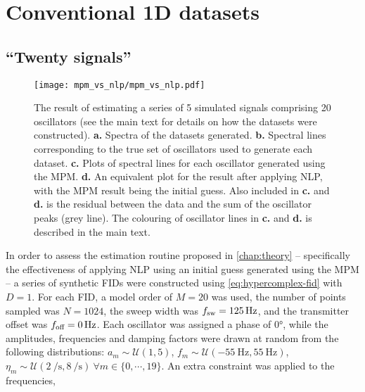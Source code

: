 \section{Conventional \ac{1D} datasets}
\label{sec:evaluation}

\subsection{``Twenty signals''}
\begin{sidewaysfigure}
    \centering
    \texttt{[image: mpm\_vs\_nlp/mpm\_vs\_nlp.pdf]}
    \caption[
        The result of estimating a series of 5 simulated signals comprising 20
        oscillators, using solely the \acs{MPM} and also with phase
        variance-regularised \acs{NLP} afterwards.
    ]{
        The result of estimating a series of 5 simulated signals comprising 20
        oscillators (see the main text for details on how the datasets were constructed).
        \textbf{a.} Spectra of the datasets generated.
        \textbf{b.} Spectral lines corresponding to the true set of oscillators
        used to generate each dataset.
        \textbf{c.} Plots of spectral lines for each oscillator generated using
        the \acs{MPM}.
        \textbf{d.} An equivalent plot for the result after applying \acs{NLP},
        with the \acs{MPM} result being the initial guess.
        Also included in \textbf{c.} and \textbf{d.} is the residual between the
        data and the sum of the oscillator peaks (grey line).
        The colouring of oscillator lines in \textbf{c.} and \textbf{d.} is
        described in the main text.
    }
    \label{fig:mpm_vs_nlp}
\end{sidewaysfigure}
In order to assess the estimation routine proposed in \cref{chap:theory}
-- specifically the effectiveness of applying \ac{NLP} using an initial guess
generated using the \ac{MPM} -- a series of synthetic \acp{FID} were constructed
using \cref{eq:hypercomplex-fid} with $D=1$. For each \ac{FID}, a model order
of $M=20$ was used, the number of points sampled was $N = 1024$, the sweep
width was $f_{\mathrm{sw}}=\qty{125}{\hertz}$, and the transmitter offset was $f_{\text{off}}
= \qty{0}{\hertz}$.  Each oscillator was assigned a phase of \ang{0}, while the
amplitudes, frequencies and damping factors were drawn at random from the
following distributions:
$a_m \sim \mathcal{U}(1, 5)$, $f_m \sim \mathcal{U}(\qty{-55}{\hertz},
\qty{55}{\hertz})$, $\eta_m \sim \mathcal{U}(\qty{2}{\per\second},
\qty{8}{\per\second})\ \forall m \in \lbrace 0, \cdots, 19\rbrace$. An extra
constraint was applied to the frequencies,
